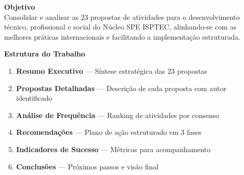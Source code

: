 \documentclass[12pt,a4paper,oneside]{article}
\begin{document}
\vspace{1.8cm}

\noindent{}

\vspace{1.5cm}

\noindent\colorbox{spe-light}{%
  \begin{minipage}{\textwidth}
    \textbf{\color{spe-primary}Objetivo}\\[0.3cm]
    \color{spe-dark}
    Consolidar e analisar as 23 propostas de atividades para o desenvolvimento técnico, profissional e social do Núcleo SPE ISPTEC, alinhando-se com as melhores práticas internacionais e facilitando a implementação estruturada.
  \end{minipage}%
}

\vspace{1.8cm}

\noindent\textbf{\color{spe-secondary}Estrutura do Trabalho}

\begin{enumerate}[label=\textbf{\color{spe-secondary}\arabic*.}]
  \item \textbf{Resumo Executivo} — Síntese estratégica das 23 propostas
  \item \textbf{Propostas Detalhadas} — Descrição de cada proposta com autor identificado
  \item \textbf{Análise de Frequência} — Ranking de atividades por consenso
  \item \textbf{Recomendações} — Plano de ação estruturado em 3 fases
  \item \textbf{Indicadores de Sucesso} — Métricas para acompanhamento
  \item \textbf{Conclusões} — Próximos passos e visão final
\end{enumerate}
\end{document}
